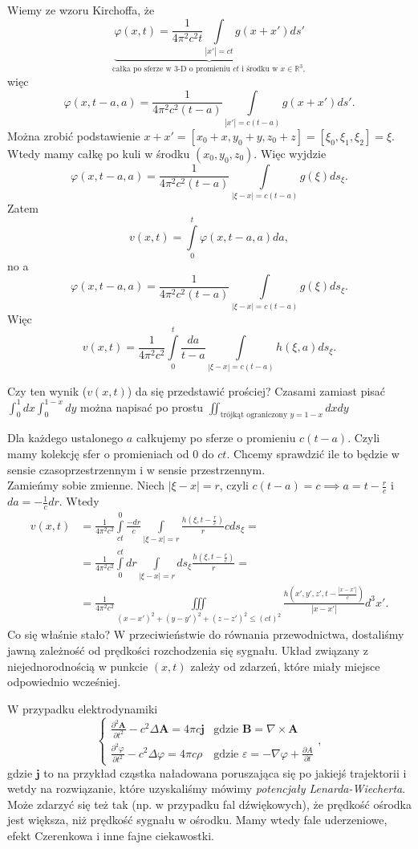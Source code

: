 \documentclass[../main.tex]{subfiles}
\begin{document}
Wiemy ze wzoru Kirchoffa, że
\[
		\underbrace{\varphi(x,t) = \frac{1}{4\pi^2c^2 t}\int\limits_{|x'|=ct}g(x+x')d s'}_{\text{całka po sferze w 3-D o promieniu $ct$ i środku w $x\in\mathbb{R}^3$},}
\]
więc
\[
		\varphi(x,t-a,a) = \frac{1}{4\pi^2c^2(t-a)}\int\limits_{|x'|=c(t-a)}g(x+x')d s'
.\]
Można zrobić podstawienie $x + x' = \left[ x_0 + x, y_0+y, z_0+z \right] = \left[ \xi_0,\xi_1,\xi_2 \right] = \xi.$ Wtedy mamy całkę po kuli w środku $(x_0,y_0,z_0)$. Więc wyjdzie
\[
		\varphi(x,t-a,a) = \frac{1}{4\pi^2c^2(t-a)}\int\limits_{|\xi-x|=c(t-a)}g(\xi)d s_\xi
.\]
Zatem
\[
		v(x,t) = \int\limits_0^t \varphi(x,t-a,a)da
,\]
no a
\[
		\varphi(x,t-a,a) = \frac{1}{4\pi^2c^2(t-a)}\int\limits_{|\xi-x|=c(t-a)}g(\xi)d s_\xi
.\]
Więc
\[
		v(x,t) = \frac{1}{4\pi^2c^2}\int\limits_0^t \frac{da}{t-a}\int\limits_{|\xi-x|=c(t-a)}h(\xi,a)d s_\xi
.\]
\begin{pytanie}
		Czy ten wynik ($v(x,t)$) da się przedstawić prościej? Czasami zamiast pisać $\int_0^1dx\int_0^{1-x}dy$ można napisać po prostu $\iint_{\text{trójkąt ograniczony $y=1-x$}}dxdy$
\end{pytanie}
Dla każdego ustalonego $a$ całkujemy po sferze o promieniu $c(t-a)$. Czyli mamy kolekcję sfer o promieniach od $0$ do $ct$. Chcemy sprawdzić ile to będzie w sensie czasoprzestrzennym i w sensie przestrzennym.\\
Zamieńmy sobie zmienne. Niech $|\xi-x| = r$, czyli $c(t-a) = c \implies a = t- \frac{r}{c}$ i $da = -\frac{1}{c}dr$. Wtedy
\begin{align*}
		v(x,t) &= \frac{1}{4\pi^2c^2}\int\limits_{ct}^{0}\frac{-dr}{c} \int\limits_{|\xi-x|=r}\frac{h(\xi,t-\frac{r}{c})}{r}c d s_\xi = \\
		&= \frac{1}{4\pi^2c^2}\int\limits_0^{ct}dr\int\limits_{|\xi-x|=r}d s_\xi \frac{h(\xi,t-\frac{r}{c})}{r} = \\
		&= \frac{1}{4\pi^2c^2}\iiint\limits_{(x-x')^2 + (y-y')^2 + (z-z')^2 \le (ct)^2}\frac{h(x',y',z',t - \frac{|x-x'|}{c})}{|x-x'|}d^3x'
.\end{align*}
Co się właśnie stało? W przeciwieństwie do równania przewodnictwa, dostaliśmy jawną zależność od prędkości rozchodzenia się sygnału. Układ związany z niejednorodnością w punkcie $(x,t)$ zależy od zdarzeń, które miały miejsce odpowiednio wcześniej.
\begin{przyklad}
W przypadku elektrodynamiki
\[
		\begin{cases}
				\frac{\partial ^2 \mathbf{A}}{\partial t^2} - c^2\Delta \mathbf{A} = 4\pi c \mathbf{j} & \text{gdzie } \mathbf{B} = \nabla\times \mathbf{A}\\
				\frac{\partial ^2 \varphi}{\partial t^2} - c^2\Delta \varphi = 4\pi c \rho&\text{gdzie } \varepsilon = - \nabla \varphi + \frac{\partial A}{\partial t}
		\end{cases}
,\]
gdzie $\mathbf{j}$ to na przykład cząstka naładowana poruszająca się po jakiejś trajektorii i wetdy na rozwiązanie, które uzyskaliśmy mówimy \textit{potencjały Lenarda-Wiecherta}.\\
		Może zdarzyć się też tak (np. w przypadku fal dźwiękowych), że prędkość ośrodka jest większa, niż prędkość sygnału w ośrodku. Mamy wtedy fale uderzeniowe, efekt Czerenkowa i inne fajne ciekawostki.
\end{przyklad}
\end{document}

